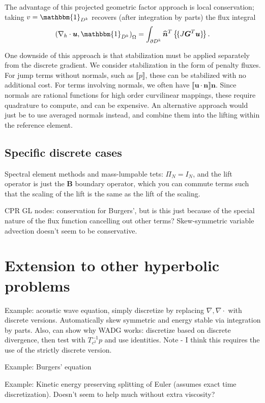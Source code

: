 \documentclass[preprint,10pt]{article}
\theoremstyle{definition}
\theoremstyle{lemma}
\newcommand{\bbm}[1]{\mathbbm{#1}}
\newcommand{\LRp}[1]{\left( #1 \right)}
\newcommand{\LRc}[1]{\left\{ #1 \right\}}
\newcommand{\Grad} {\ensuremath{\nabla}}
\newcommand{\jump}[1] {\ensuremath{\llbracket#1\rrbracket}}
\newcommand{\avg}[1] {\ensuremath{\LRc{\!\{#1\}\!}}}
\begin{document}
The advantage of this projected geometric factor approach is local conservation; taking $v = \bbm{1}_{D^k}$ recovers (after integration by parts) the flux integral
\[
\LRp{\Grad_h \cdot \bm{u},\bbm{1}_{D^k}}_{\Omega} = \int_{\partial D^k}\widehat{\bm{n}}^T\avg{J\bm{G}^T\bm{u}}.
\]

One downside of this approach is that stabilization must be applied separately from the discrete gradient.  We consider stabilization in the form of penalty fluxes.  For jump terms without normals, such as $\jump{p}$, these can be stabilized with no additional cost.  For terms involving normals, we often have $\jump{\bm{u}\cdot\bm{n}}\bm{n}$.  Since normals are rational functions for high order curvilinear mappings, these require quadrature to compute, and can be expensive.  An alternative approach would just be to use averaged normals instead, and combine them into the lifting within the reference element.  

\subsection{Specific discrete cases}

Spectral element methods and mass-lumpable tets: $\Pi_N = I_N$, and the lift operator is just the $\bm{B}$ boundary operator, which you can commute terms such that the scaling of the lift is the same as the lift of the scaling.  

CPR GL nodes: conservation for Burgers', but is this just because of the special nature of the flux function cancelling out other terms?  Skew-symmetric variable advection doesn't seem to be conservative.

\section{Extension to other hyperbolic problems}

Example: acoustic wave equation, simply discretize by replacing $\Grad, \Grad\cdot$ with discrete versions.  Automatically skew symmetric and energy stable via integration by parts.  Also, can show why WADG works: discretize based on discrete divergence, then test with $T_{c^2}^{-1}p$ and use identities.  Note - I think this requires the use of the strictly discrete version.  

Example: Burgers' equation

Example: Kinetic energy preserving splitting of Euler (assumes exact time discretization).  Doesn't seem to help much without extra viscosity?  
\end{document}
